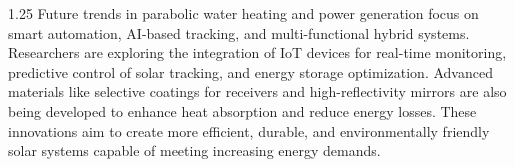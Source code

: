 \begin{spacing}{1.25}
{Future trends in parabolic water heating and power generation focus on smart automation, AI-based tracking, and multi-functional hybrid systems. Researchers are exploring the integration of IoT devices for real-time monitoring, predictive control of solar tracking, and energy storage optimization. Advanced materials like selective coatings for receivers and high-reflectivity mirrors are also being developed to enhance heat absorption and reduce energy losses. These innovations aim to create more efficient, durable, and environmentally friendly solar systems capable of meeting increasing energy demands.
}
\end{spacing}
\clearpage
